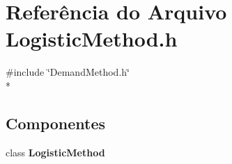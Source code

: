 \section{Referência do Arquivo Logistic\+Method.\+h}
\label{_logistic_method_8h}
{\ttfamily \#include \char`\"{}Demand\+Method.\+h\char`\"{}}\\*
\subsection*{Componentes}
\begin{DoxyCompactItemize}
\item 
class {\bf Logistic\+Method}
\end{DoxyCompactItemize}
